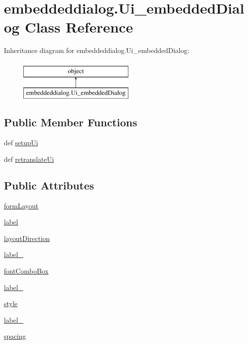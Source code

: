 \hypertarget{classembeddeddialog_1_1Ui__embeddedDialog}{}\section{embeddeddialog.\+Ui\+\_\+embedded\+Dialog Class Reference}
\label{classembeddeddialog_1_1Ui__embeddedDialog}
Inheritance diagram for embeddeddialog.\+Ui\+\_\+embedded\+Dialog\+:\begin{figure}[H]
\begin{center}
\leavevmode
\includegraphics[height=2.000000cm]{classembeddeddialog_1_1Ui__embeddedDialog}
\end{center}
\end{figure}
\subsection*{Public Member Functions}
\begin{DoxyCompactItemize}
\item 
def \hyperlink{classembeddeddialog_1_1Ui__embeddedDialog_abdf2cbdd1131bbe211eb5dc5b81ca113}{setup\+Ui}
\item 
def \hyperlink{classembeddeddialog_1_1Ui__embeddedDialog_a923a7bdf3671f7cfbbfeeabef11ee6c1}{retranslate\+Ui}
\end{DoxyCompactItemize}
\subsection*{Public Attributes}
\begin{DoxyCompactItemize}
\item 
\hyperlink{classembeddeddialog_1_1Ui__embeddedDialog_af66a8b235393c62312c2854e53e9136e}{form\+Layout}
\item 
\hyperlink{classembeddeddialog_1_1Ui__embeddedDialog_a507dfc91913a6c288f870f91ecaea370}{label}
\item 
\hyperlink{classembeddeddialog_1_1Ui__embeddedDialog_a6062b016e4900d16054adb173a5a9fd6}{layout\+Direction}
\item 
\hyperlink{classembeddeddialog_1_1Ui__embeddedDialog_a404d307df5e48affa0cbe7ab8d93c3ce}{label\+\_}
\item 
\hyperlink{classembeddeddialog_1_1Ui__embeddedDialog_aff371019f6bd2fbc5b3e48c127037ec9}{font\+Combo\+Box}
\item 
\hyperlink{classembeddeddialog_1_1Ui__embeddedDialog_a21a8f27b721a9d8d1add96b9237627b3}{label\+\_}
\item 
\hyperlink{classembeddeddialog_1_1Ui__embeddedDialog_a1831a09b854b2cacc4f5805a75f9b72e}{style}
\item 
\hyperlink{classembeddeddialog_1_1Ui__embeddedDialog_a77e5460f82be76008111f61d98462b09}{label\+\_}
\item 
\hyperlink{classembeddeddialog_1_1Ui__embeddedDialog_a04fe0eb0ba7f9c95d4b67cd512b4936b}{spacing}
\end{DoxyCompactItemize}


